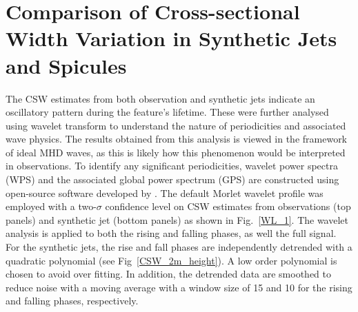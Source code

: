 \documentclass[12pt]{ociamthesis}
\newcommand{\np}{\\ \\}
\begin{document}
\section{Comparison of Cross-sectional Width Variation in Synthetic Jets and Spicules}
\label{sec:CSW_comp}
The CSW estimates from both observation and synthetic jets indicate an oscillatory pattern during the feature’s lifetime. These were further analysed using wavelet transform to understand the nature of periodicities and associated wave physics. The results obtained from this analysis is viewed in the framework of ideal MHD waves, as this is likely how this phenomenon would be interpreted in observations. To identify any significant periodicities, wavelet power spectra (WPS) and the associated global power spectrum (GPS) are constructed using open-source software developed by \cite{Torrence1998}. The default Morlet wavelet profile was employed with a two-$\sigma$ confidence level on CSW estimates from observations (top panels) and synthetic jet (bottom panels) as shown in Fig.~\ref{WL_1}. The wavelet analysis is applied to both the rising and falling phases, as well the full signal. For the synthetic jets, the rise and fall phases are independently detrended with a quadratic polynomial (see Fig~\ref{CSW_2m_height}). A low order polynomial is chosen to avoid over fitting. In addition, the detrended data are smoothed to reduce noise with a moving average with a window size of 15 and 10 for the rising and falling phases, respectively. \np
%
\end{document}
